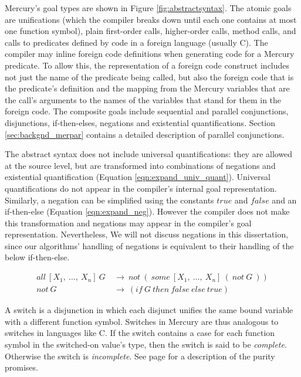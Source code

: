 \noindent
Mercury's goal types are shown in Figure \ref{fig:abstractsyntax}.
The atomic goals are unifications
(which the compiler breaks down until each one contains
at most one function symbol),
plain first-order calls,
higher-order calls,
method calls,
and calls to predicates defined by code in a foreign language (usually C).
The compiler may inline foreign code definitions when generating code
for a Mercury predicate.
To allow this, the representation of a foreign code construct includes
not just the name of the predicate being called,
but also the foreign code that is the predicate's definition
and the mapping from the Mercury variables that are the call's arguments
to the names of the variables that stand for them in the foreign code.
The composite goals include
sequential and parallel conjunctions,
disjunctions, if-then-elses, negations and existential quantifications.
Section \ref{sec:backgnd_merpar} contains a detailed description of parallel
conjunctions.

The abstract syntax does not include universal quantifications:
they are allowed at the source level,
but are transformed into combinations of negations and existential quantification
(Equation \ref{eqn:expand_univ_quant}).
Universal quantifications do not appear in the compiler's internal goal
representation.
Similarly,
a negation can be simplified using the constants $true$ and $false$ and an
if-then-else (Equation \ref{eqn:expand_neg}).
However the compiler does not make this transformation and
negations may appear in the compiler's goal representation.
Nevertheless, We will not discuss negations in this dissertation,
since our algorithms' handling of negations is equivalent
to their handling of the below if-then-else.

\begin{align}
all~[X_1,~\ldots,~X_n]~G~&\rightarrow~not~(~some~[X_1,~\ldots,~X_n]~(~not~G~))
\label{eqn:expand_univ_quant}
\\
not~G~&\rightarrow~(if~G~then~false~else~true)
\label{eqn:expand_neg}
\end{align}

A switch is a disjunction in which
each disjunct unifies the same bound variable
with a different function symbol.
Switches in Mercury are thus analogous to switches in languages like C.
If the switch contains a case for each function symbol in the
switched-on value's type, then the switch is said to be \emph{complete}.
Otherwise the switch is \emph{incomplete}.
See page \pageref{page:purity} for a description of the purity promises.

